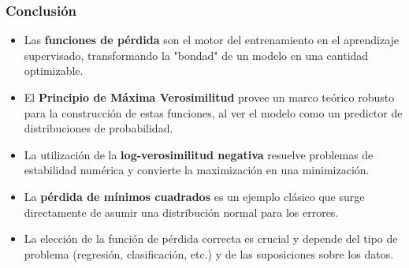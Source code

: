 \documentclass[aspectratio=169, 10pt]{beamer}
\begin{document}
				\begin{frame}
					\frametitle{Conclusión}
					\begin{itemize}
						\item Las \textbf{funciones de pérdida} son el motor del entrenamiento en el aprendizaje supervisado, transformando la "bondad" de un modelo en una cantidad optimizable.
						\item El \textbf{Principio de Máxima Verosimilitud} provee un marco teórico robusto para la construcción de estas funciones, al ver el modelo como un predictor de distribuciones de probabilidad.
						\item La utilización de la \textbf{log-verosimilitud negativa} resuelve problemas de estabilidad numérica y convierte la maximización en una minimización.
						\item La \textbf{pérdida de mínimos cuadrados} es un ejemplo clásico que surge directamente de asumir una distribución normal para los errores.
						\item La elección de la función de pérdida correcta es crucial y depende del tipo de problema (regresión, clasificación, etc.) y de las suposiciones sobre los datos.
					\end{itemize}
				\end{frame}
				
	
\end{document}
